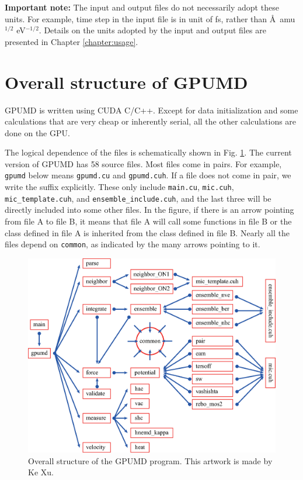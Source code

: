 \documentclass[12pt,a4paper]{report}
\begin{document}
\textbf{Important note:}
The input and output files do not necessarily adopt these units. For example, time step in the input file is in unit of fs, rather than \AA~amu$^{1/2}$ eV$^{-1/2}$. Details on the units adopted by the input and output files are presented in Chapter \ref{chapter:usage}.


\section{Overall structure of GPUMD}

GPUMD is written using CUDA C/C++. Except for data initialization and some calculations that are very cheap or inherently serial, all the other calculations are done on the GPU.

 The logical dependence of the files is schematically shown in Fig. \ref{figure:gpumd-structure}.
The current version of GPUMD has 58 source files. Most files come in pairs. For example, \verb"gpumd" below means \verb"gpumd.cu" and \verb"gpumd.cuh". If a file does not come in pair, we write the suffix explicitly. These only include \verb"main.cu", \verb"mic.cuh", \verb"mic_template.cuh", and \verb"ensemble_include.cuh", and the last three will be directly included into some other files. In the figure, if there is an arrow pointing from file A to file B, it means that file A will call some functions in file B or the class defined in file A is inherited from the class defined in file B. Nearly all the files depend on \verb"common", as indicated by the many arrows pointing to it.


\begin{figure}[ht]
\begin{center}
\includegraphics[width=\columnwidth]{gpumd-structure.eps}
\caption{Overall structure of the GPUMD program. This artwork is made by Ke Xu.}
\label{figure:gpumd-structure}
\end{center}
\end{figure}
\end{document}
